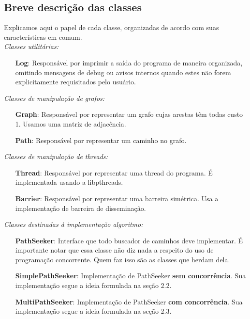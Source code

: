 \documentclass[a4paper,11pt]{article}
\begin{document}
  \subsection{Breve descrição das classes}
    Explicamos aqui o papel de cada classe, organizadas de acordo com suas
    características em comum. \\

    \textit{Classes utilitárias:}
    \begin{itemize}
      \item[\textbf{Log}:]
        Responsável por imprimir a saída do programa de maneira organizada,
        omitindo mensagens de debug ou avisos internos quando estes não forem
        explicitamente requisitados pelo usuário.
    \end{itemize}

    \textit{Classes de manipulação de grafos:}
    \begin{itemize}
      \item[\textbf{Graph}:]
        Responsável por representar um grafo cujas arestas têm todas custo 1.
        Usamos uma matriz de adjacência.
      \item[\textbf{Path}:]
        Responsável por representar um caminho no grafo.
    \end{itemize}

    \textit{Classes de manipulação de threads:}
    \begin{itemize}
      \item[\textbf{Thread}:]
        Responsável por representar uma thread do programa. É implementada
        usando a libpthreads.
      \item[\textbf{Barrier}:]
        Responsável por representar uma barreira simétrica. Usa a implementação
        de barreira de disseminação.
    \end{itemize}

    \textit{Classes destinadas à implementação algoritmo:}
    \begin{itemize}
      \item[\textbf{PathSeeker}:]
        Interface que todo buscador de caminhos deve implementar. É importante
        notar que essa classe não diz nada a respeito do uso de programação
        concorrente. Quem faz isso são as classes que herdam dela.
      \item[\textbf{SimplePathSeeker}:]
        Implementação de PathSeeker \textbf{sem concorrência}. Sua implementação
        segue a ideia formulada na seção 2.2.
      \item[\textbf{MultiPathSeeker}:]
        Implementação de PathSeeker \textbf{com concorrência}. Sua implementação
        segue a ideia formulada na seção 2.3.
    \end{itemize}
\end{document}
